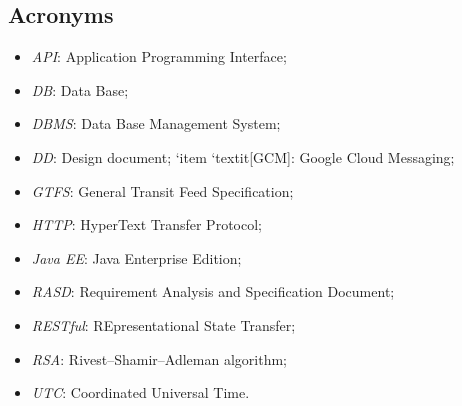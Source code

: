 \subsection{Acronyms}
	\begin{itemize}
	\item \textit{API}: Application Programming Interface;
	\item \textit{DB}: Data Base;
	\item \textit{DBMS}: Data Base Management System;
	\item \textit{DD}: Design document;
	`item `textit[GCM]: Google Cloud Messaging;
	\item \textit{GTFS}: General Transit Feed Specification;
	\item \textit{HTTP}: HyperText Transfer Protocol;
	\item \textit{Java EE}: Java Enterprise Edition;
	\item \textit{RASD}: Requirement Analysis and Specification Document;
	\item \textit{RESTful}: REpresentational State Transfer;
	\item \textit{RSA}: Rivest–Shamir–Adleman algorithm;
	\item \textit{UTC}: Coordinated Universal Time.
	\end{itemize}
	
